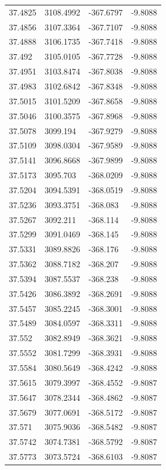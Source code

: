 \begin{table}[H]
\begin{tabular}{llll}
37.4825 & 3108.4992 & -367.6797 & -9.8088 \\
37.4856 & 3107.3364 & -367.7107 & -9.8088 \\
37.4888 & 3106.1735 & -367.7418 & -9.8088 \\
37.492 & 3105.0105 & -367.7728 & -9.8088 \\
37.4951 & 3103.8474 & -367.8038 & -9.8088 \\
37.4983 & 3102.6842 & -367.8348 & -9.8088 \\
37.5015 & 3101.5209 & -367.8658 & -9.8088 \\
37.5046 & 3100.3575 & -367.8968 & -9.8088 \\
37.5078 & 3099.194 & -367.9279 & -9.8088 \\
37.5109 & 3098.0304 & -367.9589 & -9.8088 \\
37.5141 & 3096.8668 & -367.9899 & -9.8088 \\
37.5173 & 3095.703 & -368.0209 & -9.8088 \\
37.5204 & 3094.5391 & -368.0519 & -9.8088 \\
37.5236 & 3093.3751 & -368.083 & -9.8088 \\
37.5267 & 3092.211 & -368.114 & -9.8088 \\
37.5299 & 3091.0469 & -368.145 & -9.8088 \\
37.5331 & 3089.8826 & -368.176 & -9.8088 \\
37.5362 & 3088.7182 & -368.207 & -9.8088 \\
37.5394 & 3087.5537 & -368.238 & -9.8088 \\
37.5426 & 3086.3892 & -368.2691 & -9.8088 \\
37.5457 & 3085.2245 & -368.3001 & -9.8088 \\
37.5489 & 3084.0597 & -368.3311 & -9.8088 \\
37.552 & 3082.8949 & -368.3621 & -9.8088 \\
37.5552 & 3081.7299 & -368.3931 & -9.8088 \\
37.5584 & 3080.5649 & -368.4242 & -9.8088 \\
37.5615 & 3079.3997 & -368.4552 & -9.8087 \\
37.5647 & 3078.2344 & -368.4862 & -9.8087 \\
37.5679 & 3077.0691 & -368.5172 & -9.8087 \\
37.571 & 3075.9036 & -368.5482 & -9.8087 \\
37.5742 & 3074.7381 & -368.5792 & -9.8087 \\
37.5773 & 3073.5724 & -368.6103 & -9.8087 \\

\end{tabular}
\end{table}
